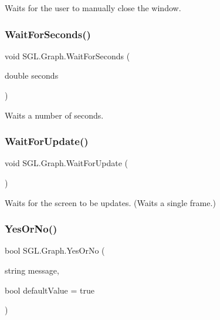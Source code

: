Waits for the user to manually close the window. 

\mbox{\label{class_s_g_l_1_1_graph_aac0d51ab73e1f78788e9ecb6afc9d532}} 
\subsubsection{\texorpdfstring{Wait\+For\+Seconds()}{WaitForSeconds()}}
{\footnotesize\ttfamily void S\+G\+L.\+Graph.\+Wait\+For\+Seconds (\begin{DoxyParamCaption}\item[{double}]{seconds }\end{DoxyParamCaption})\hspace{0.3cm}{\ttfamily [inline]}}



Waits a number of seconds. 

\mbox{\label{class_s_g_l_1_1_graph_ab4b0c60affd657436340a67b2e9ac2bd}} 
\subsubsection{\texorpdfstring{Wait\+For\+Update()}{WaitForUpdate()}}
{\footnotesize\ttfamily void S\+G\+L.\+Graph.\+Wait\+For\+Update (\begin{DoxyParamCaption}{ }\end{DoxyParamCaption})\hspace{0.3cm}{\ttfamily [inline]}}



Waits for the screen to be updates. (Waits a single frame.) 

\mbox{\label{class_s_g_l_1_1_graph_add2e8a9bb0b5174fc9a80e21b7d407e8}} 
\subsubsection{\texorpdfstring{Yes\+Or\+No()}{YesOrNo()}}
{\footnotesize\ttfamily bool S\+G\+L.\+Graph.\+Yes\+Or\+No (\begin{DoxyParamCaption}\item[{string}]{message,  }\item[{bool}]{default\+Value = {\ttfamily true} }\end{DoxyParamCaption})\hspace{0.3cm}{\ttfamily [inline]}}



